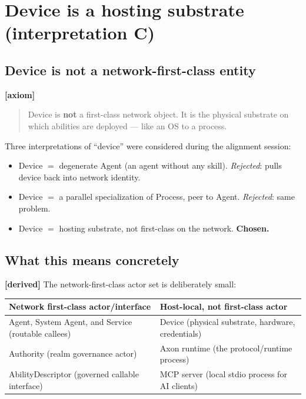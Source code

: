 \documentclass[11pt,a4paper]{article}
\newcommand{\axiom}{\textcolor{axiomcolor}{\textbf{[axiom]}}\xspace}
\newcommand{\derived}{\textcolor{derivedcolor}{\textbf{[derived]}}\xspace}
\begin{document}
\section{Device is a hosting substrate (interpretation C)}
\label{sec:device-c}

\subsection{Device is not a network-first-class entity}

\axiom{}
\begin{quote}
Device is \textbf{not} a first-class network object. It is the physical
substrate on which abilities are deployed --- like an OS to a process.
\end{quote}

Three interpretations of ``device'' were considered during the alignment
session:

\begin{itemize}[leftmargin=2em,itemsep=0.3em]
    \item[(A)] Device $=$ degenerate Agent (an agent without any skill).
    \emph{Rejected}: pulls device back into network identity.
    \item[(B)] Device $=$ a parallel specialization of Process, peer to
    Agent. \emph{Rejected}: same problem.
    \item[(C)] Device $=$ hosting substrate, not first-class on the network.
    \textbf{Chosen.}
\end{itemize}

\subsection{What this means concretely}

\derived{} The network-first-class actor set is deliberately small:

\begin{center}
\renewcommand{\arraystretch}{1.25}
\begin{tabularx}{\linewidth}{X X}
\toprule
\textbf{Network first-class actor/interface} & \textbf{Host-local, not first-class actor} \\
\midrule
Agent, System Agent, and Service (routable callees) & Device (physical
substrate, hardware, credentials) \\
Authority (realm governance actor) & Axon runtime (the protocol/runtime
process) \\
AbilityDescriptor (governed callable interface) & MCP server (local stdio process for AI
clients) \\
\bottomrule
\end{tabularx}
\end{center}
\end{document}
